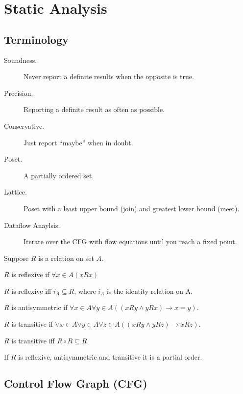 \chapter{Static Analysis}

\section{Terminology}

\begin{description}
  \item[Soundness.] Never report a definite results when the opposite is true.
  \item[Precision.] Reporting a definite result as often as possible.
  \item[Conservative.] Just report ``maybe'' when in doubt.
  \item[Poset.] A partially ordered set.
  \item[Lattice.] Poset with a least upper bound (join) and greatest lower bound
                  (meet).
  \item[Dataflow Anaylsis.] Iterate over the CFG with flow equations until you
                            reach a fixed point.
\end{description}

Suppose $R$ is a relation on set $A$.

$R$ is reflexive if $\forall x \in A (x R x)$

$R$ is reflexive iff $i_A \subseteq R$, where $i_A$ is the identity  relation
on A.

$R$ is antisymmetric if $\forall x \in A \forall y \in A ((x R y \land y R x)
\rightarrow x = y)$.

$R$ is transitive if $\forall x \in A \forall y \in A \forall z \in A
((x R y \land y R z) \rightarrow x R z)$.

$R$ is transitive iff $R \circ R \subseteq R$.

If $R$ is reflexive, antisymmetric and transitive it is a partial order.

\section{Control Flow Graph (CFG)}


